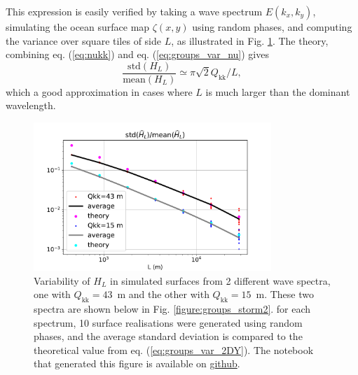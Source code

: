 {This expression is easily verified by taking a wave spectrum $E(k_x,k_y)$, simulating the ocean surface map $\zeta(x,y)$ using random phases, and computing the variance over square tiles of side $L$, as illustrated in Fig. \ref{fig:groups_maps}. The theory, combining eq. (\ref{eq:nukk}) and eq. (\ref{eq:groups_var_nu}) gives 
\begin{equation} 
 \frac{\mathrm{std}(H_L)}{\mathrm{mean}(H_L)} \simeq \pi \sqrt{2}  Q_{\mathrm{kk}} /  L,
   \label{eq:groups_var_2DY}
\end{equation}
which a good approximation in cases where $L$ is much larger than the dominant wavelength. 
\begin{figure}[htb]
\centerline{\includegraphics[width=0.8\textwidth]{FIGS_CH_GROUPS/std_maps.pdf}}
  \caption{Variability of $H_L$ in simulated surfaces from 2 different wave spectra, one with $Q_{\mathrm{kk}}=43$~m and the other with $Q_{\mathrm{kk}}=15$~m. These two spectra are shown below in Fig. \ref{figure:groups_storm2}. for each spectrum, 10 surface realisations were generated using random phases, and the average standard deviation is compared to the 
  theoretical value from eq. (\ref{eq:groups_var_2DY}). The notebook that generated this figure is available on \href{https://github.com/ardhuin/waves_in_geosciences/blob/main/NOTEBOOKS/chapter_groups_figure_Qkk_stdH_2D_maps.ipynb}{github}.}
\label{fig:groups_maps}
\end{figure}


}
